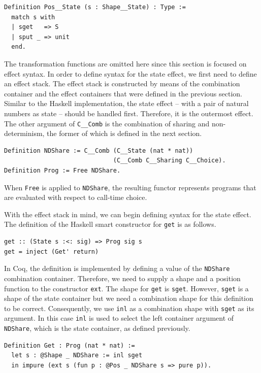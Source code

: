 \documentclass[a4paper, 11pt, fleqn, twoside]{scrreprt}
\newcommand{\hinl}[1]{\texttt{#1}}
\newcommand{\cinl}[1]{\texttt{#1}}
\begin{document}
\begin{verbatim}
Definition Pos__State (s : Shape__State) : Type :=
  match s with
  | sget   => S
  | sput _ => unit
  end.
\end{verbatim}

The transformation functions are omitted here since this section is focused on effect syntax.
In order to define syntax for the state effect, we first need to define an effect stack.
The effect stack is constructed by means of the combination container and the effect containers that were defined in the previous section.
Similar to the Haskell implementation, the state effect -- with a pair of natural numbers as state -- should be handled first.
Therefore, it is the outermost effect.
The other argument of \cinl{C__Comb} is the combination of sharing and non-determinism, the former of which is defined in the next section.
 
\begin{verbatim}
Definition NDShare := C__Comb (C__State (nat * nat)) 
                              (C__Comb C__Sharing C__Choice).
Definition Prog := Free NDShare.
\end{verbatim}

When \cinl{Free} is applied to \cinl{NDShare}, the resulting functor represents programs that are evaluated with respect to call-time choice.

With the effect stack in mind, we can begin defining syntax for the state effect.
The definition of the Haskell smart constructor for \hinl{get} is as follows.

\begin{verbatim}
get :: (State s :<: sig) => Prog sig s
get = inject (Get' return)
\end{verbatim}

In Coq, the definition is implemented by defining a value of the \cinl{NDShare} combination container.
Therefore, we need to supply a shape and a position function to the constructor \cinl{ext}.
The shape for \hinl{get} is \cinl{sget}.
However, \cinl{sget} is a shape of the state container but we need a combination shape for this definition to be correct.
Consequently, we use \cinl{inl} as a combination shape with \cinl{sget} as its argument.
In this case \cinl{inl} is used to select the left container argument of \cinl{NDShare}, which is the state container, as defined previously.

\begin{verbatim}
Definition Get : Prog (nat * nat) :=
  let s : @Shape _ NDShare := inl sget
  in impure (ext s (fun p : @Pos _ NDShare s => pure p)).
\end{verbatim}
\end{document}
